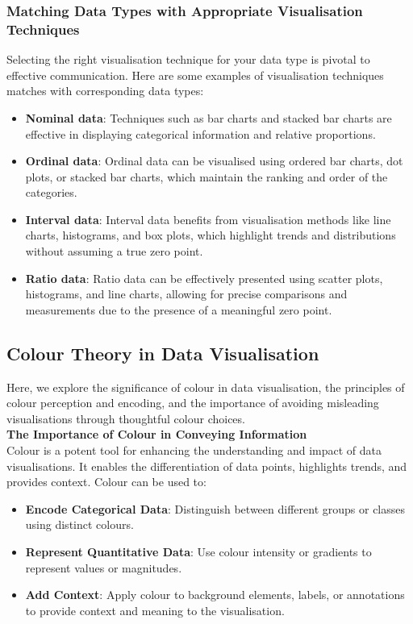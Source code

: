 \documentclass{article}\usepackage[]{graphicx}\usepackage[]{xcolor}
\begin{document}
\subsubsection{Matching Data Types with Appropriate Visualisation Techniques}
Selecting the right visualisation technique for your data type is pivotal to effective communication. Here are some examples of visualisation techniques matches with corresponding data types: 
\begin{itemize}
    \item \textbf{Nominal data}: Techniques such as bar charts and stacked bar charts are effective in displaying categorical information and relative proportions. 
    \item \textbf{Ordinal data}: Ordinal data can be visualised using ordered bar charts, dot plots, or stacked bar charts, which maintain the ranking and order of the categories.
    \item \textbf{Interval data}: Interval data benefits from visualisation methods like line charts, histograms, and box plots, which highlight trends and distributions without assuming a true zero point. 
    \item \textbf{Ratio data}: Ratio data can be effectively presented using scatter plots, histograms, and line charts, allowing for precise comparisons and measurements due to the presence of a meaningful zero point. 
\end{itemize}


\subsection{Colour Theory in Data Visualisation}
Here, we explore the significance of colour in data visualisation, the principles of colour perception and encoding, and the importance of avoiding misleading visualisations through thoughtful colour choices.\\

\textbf{The Importance of Colour in Conveying Information}\\
Colour is a potent tool for enhancing the understanding and impact of data visualisations. It enables the differentiation of data points, highlights trends, and provides context. Colour can be used to:
\begin{itemize}
    \item \textbf{Encode Categorical Data}: Distinguish between different groups or classes using distinct colours.
    \item \textbf{Represent Quantitative Data}: Use colour intensity or gradients to represent values or magnitudes.
    \item \textbf{Add Context}: Apply colour to background elements, labels, or annotations to provide context and meaning to the visualisation.
\end{itemize}
\end{document}
